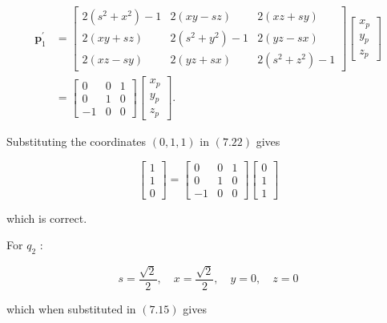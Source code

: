 $$
\begin{aligned}
\mathbf{p}_{1}^{\prime} & =\left[\begin{array}{ccc}
2\left(s^{2}+x^{2}\right)-1 & 2(x y-s z) & 2(x z+s y) \\
2(x y+s z) & 2\left(s^{2}+y^{2}\right)-1 & 2(y z-s x) \\
2(x z-s y) & 2(y z+s x) & 2\left(s^{2}+z^{2}\right)-1
\end{array}\right]\left[\begin{array}{l}
x_{p} \\
y_{p} \\
z_{p}
\end{array}\right] \\
& =\left[\begin{array}{ccc}
0 & 0 & 1 \\
0 & 1 & 0 \\
-1 & 0 & 0
\end{array}\right]\left[\begin{array}{l}
x_{p} \\
y_{p} \\
z_{p}
\end{array}\right] .
\end{aligned}
$$

Substituting the coordinates $(0,1,1)$ in $(7.22)$ gives

$$
\left[\begin{array}{l}
1 \\
1 \\
0
\end{array}\right]=\left[\begin{array}{ccc}
0 & 0 & 1 \\
0 & 1 & 0 \\
-1 & 0 & 0
\end{array}\right]\left[\begin{array}{l}
0 \\
1 \\
1
\end{array}\right]
$$

which is correct.

For $q_{2}$ :

$$
s=\frac{\sqrt{2}}{2}, \quad x=\frac{\sqrt{2}}{2}, \quad y=0, \quad z=0
$$

which when substituted in $(7.15)$ gives

